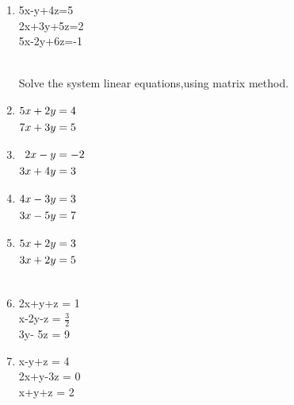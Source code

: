 \documentclass[journal,12pt,twocolumn]{IEEEtran}
\renewcommand\thesection{\arabic{section}}
\begin{document}
\begin{enumerate}[label=\thesection.\arabic*.,ref=\thesection.\theenumi]
\\
\solution 

\item 5x-y+4z=5 \\ 2x+3y+5z=2 \\ 5x-2y+6z=-1\\
\\
\solution

Solve the system linear equations,using matrix method.
\item 
$\begin{alignedat}[t]{2}
5x+2y&=4 \\ 7x+3y&=5
\end{alignedat}$
\\
\solution

\item 
$\begin{alignedat}[t]{2}
2x-y&=-2 \\ 3x+4y&=3
\end{alignedat}$
\\
\solution

\item $\begin{alignedat}[t]{2}
4x-3y&=3 \\ 3x-5y&=7
\end{alignedat}$
\\
\solution

\item $\begin{alignedat}[t]{2}
5x+2y&=3 \\ 3x+2y&=5
\end{alignedat}$\\
\\
\solution

\item 2x+y+z = 1 \\ x-2y-z = $\frac{3}{2}$ \\ 3y- 5z = 9\\
\item x-y+z = 4 \\ 2x+y-3z = 0 \\ x+y+z = 2\\

\end{enumerate}
\end{document}
